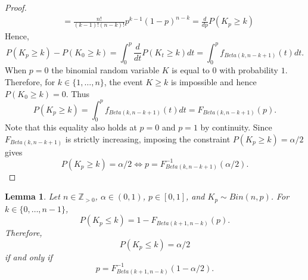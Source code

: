 \documentclass{article}
\newtheorem{lemma}{Lemma}
\begin{document}
\begin{proof}
$$\begin{aligned}
    &=\frac{n!}{(k-1)!(n-k)!}p^{k-1}(1-p)^{n-k}=\frac{d}{dp}P(K_p\geq k)
\end{aligned}$$
Hence,
$$P(K_p\geq k)-P(K_0\geq k)=\int_0^p\frac{d}{dt}P(K_t\geq k)dt=\int_0^p f_{Beta(k,n-k+1)}(t)dt.$$
When $p=0$ the binomial random variable $K$ is equal to $0$ with probability $1$. Therefore, for $k\in\{1,\ldots,n\}$, the event $K\geq k$ is impossible and hence $P(K_0\geq k)=0$. Thus
$$P(K_p\geq k)=\int_0^p f_{Beta(k,n-k+1)}(t)dt=F_{Beta(k,n-k+1)}(p).$$
Note that this equality also holds at $p=0$ and $p=1$ by continuity.
Since $F_{Beta(k,n-k+1)}$ is strictly increasing, imposing the constraint $P(K_p\geq k)=\alpha/2$ gives
$$P(K_p\geq k)=\alpha/2
\Leftrightarrow
p = F_{Beta(k,n-k+1)}^{-1}(\alpha/2).$$
\end{proof}


\begin{lemma}\label{lemma:Upper_Clopper-Pearson_endpoint}
Let $n\in\mathbb{Z}_{>0}$, $\alpha\in(0,1)$, $p\in[0,1]$, and $K_p\sim Bin(n,p)$. For $k\in\{0,\ldots,n-1\}$,
$$P(K_p\leq k)=1-F_{Beta(k+1,n-k)}(p).$$
Therefore,
$$P(K_p\leq k)=\alpha/2$$
if and only if
$$p=F_{Beta(k+1,n-k)}^{-1}(1-\alpha/2).$$
\end{lemma}
\end{document}
